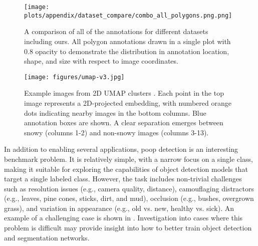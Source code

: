 \documentclass{article}
\begin{document}
\begin{figure*}[t]
\centering
\texttt{[image: plots/appendix/dataset\_compare/combo\_all\_polygons.png.png]}
\caption[]{
    A comparison of all of the annotations for different datasets including ours.
    All polygon annotations drawn in a single plot with $0.8$ opacity to
    demonstrate the distribution in annotation location, shape, and size with
    respect to image coordinates.
}
\label{fig:compare_allannots}
\end{figure*}

\begin{figure*}[t]
\centering
\texttt{[image: figures/umap-v3.jpg]}%
\caption[]{
    Example images from 2D UMAP clusters \cite{mcinnes_umap_2020}.
    Each point in the top image represents a 2D-projected embedding, with numbered orange dots indicating nearby
      images in the bottom columns.
    Blue annotation boxes are shown.
    A clear separation emerges between snowy (columns 1-2) and non-snowy images (columns 3-13).
}
\label{fig:umap_dataset_viz}
\end{figure*}


In addition to enabling several applications, poop detection is an interesting benchmark problem.
It is relatively simple, with a narrow focus on a single class, making it suitable for exploring the
  capabilities of object detection models that target a single labeled class.
However, the task includes non-trivial challenges such as resolution issues (e.g., camera quality,
  distance), camouflaging distractors (e.g., leaves, pine cones, sticks, dirt, and mud), occlusion (e.g., bushes, overgrown
  grass), and variation in appearance (e.g., old vs. new, healthy vs. sick).
An example of a challenging case is shown in .
Investigation into cases where this problem is difficult may provide insight
into how to better train object detection and segmentation networks.
\end{document}
